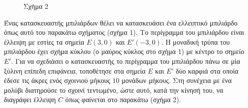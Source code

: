 \begin{figure}
\begin{minipage}[t]{0.45\textwidth}
        \caption*{\small Σχήμα 2}
    \end{minipage}
\end{figure}
Ένας κατασκευαστής μπιλιάρδων θέλει να κατασκευάσει ένα ελλειπτικό μπιλιάρδο όπως αυτό του παρακάτω σχήματος (σχήμα 1). Το περίγραμμα του μπιλιάρδου είναι έλλειψη με εστίες τα σημεία $E(3,0)$ και $E'(-3,0)$. Η μοναδική τρύπα του μπιλιάρδου έχει σχήμα κύκλου (ο μαύρος κύκλος στο σχήμα 1) με κέντρο το σημείο $E'$. Για να σχεδιάσει ο κατασκευαστής το περίγραμμα του μπιλιάρδου πάνω σε μία ξύλινη επίπεδη επιφάνεια, τοποθέτησε στα σημεία $E$ και $E'$ δύο καρφιά στα οποία έδεσε τις άκρες ενός σχοινιού μήκους $10$ μονάδων μήκους. Στη συνέχεια με ένα μολύβι διατηρούσε το σχοινί τεντωμένο, ώστε αυτό, κατά την κίνησή του, να διαγράφει έλλειψη $C$ όπως φαίνεται στο παρακάτω (σχήμα 2).

